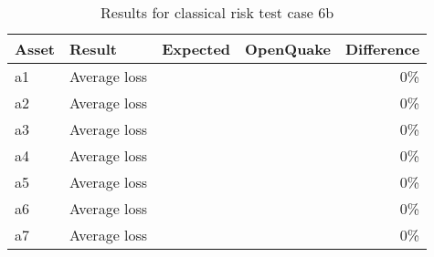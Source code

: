 \begin{table}[htbp]

\centering
\begin{tabular}{ l l r r r }

\hline
\rowcolor{anti-flashwhite}
\bf{Asset} & \bf{Result} & \bf{Expected} & \bf{OpenQuake} & \bf{Difference}\\
\hline
a1 & Average loss &  &  & 0\% \\
a2 & Average loss &  &  & 0\% \\
a3 & Average loss &  &  & 0\% \\
a4 & Average loss &  &  & 0\% \\
a5 & Average loss &  &  & 0\% \\
a6 & Average loss &  &  & 0\% \\
a7 & Average loss &  &  & 0\% \\
\hline
\end{tabular}

\caption{Results for classical risk test case 6b}
\label{tab:result-classical-risk-6b}
\end{table}